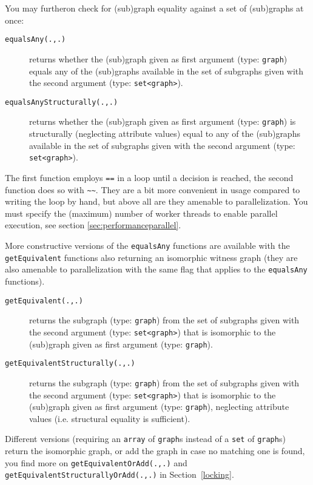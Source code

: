 \pagebreak %

You may furtheron check for (sub)graph equality against a set of (sub)graphs at once:

\begin{description}
\item[\texttt{equalsAny(.,.)}] returns whether the (sub)graph given as first argument (type: \texttt{graph}) equals any of the (sub)graphs available in the set of subgraphs given with the second argument (type: \texttt{set<graph>}).
\item[\texttt{equalsAnyStructurally(.,.)}] returns whether the (sub)graph given as first argument (type: \texttt{graph}) is structurally (neglecting attribute values) equal to any of the (sub)graphs available in the set of subgraphs given with the second argument (type: \texttt{set<graph>}).
\end{description}

The first function employs \verb#==# in a loop until a decision is reached, the second function does so with \verb#~~#.
They are a bit more convenient in usage compared to writing the loop by hand, but above all are they amenable to parallelization.
You must specify the (maximum) number of worker threads to enable parallel execution, see section \ref{sec:performanceparallel}.

More constructive versions of the \texttt{equalsAny} functions are available with the \texttt{getEquivalent} functions also returning an isomorphic witness graph (they are also amenable to parallelization with the same flag that applies to the \texttt{equalsAny} functions).
 
\begin{description}
\item[\texttt{getEquivalent(.,.)}] returns the subgraph (type: \texttt{graph}) from the set of subgraphs given with the second argument (type: \texttt{set<graph>}) that is isomorphic to the (sub)graph given as first argument (type: \texttt{graph}).
\item[\texttt{getEquivalentStructurally(.,.)}] returns the subgraph (type: \texttt{graph}) from the set of subgraphs given with the second argument (type: \texttt{set<graph>}) that is isomorphic to the (sub)graph given as first argument (type: \texttt{graph}), neglecting attribute values (i.e. structural equality is sufficient).
\end{description}

Different versions (requiring an \texttt{array} of \texttt{graph}s instead of a \texttt{set} of \texttt{graph}s) return the isomorphic graph, or add the graph in case no matching one is found, you find more on \texttt{getEquivalentOrAdd(.,.)} and \texttt{getEquivalentStructurallyOrAdd(.,.)} in Section~\ref{locking}.

